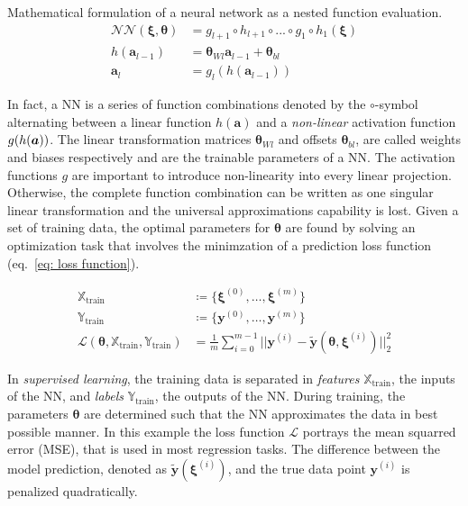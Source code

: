 \begin{definition} Mathematical formulation of a neural network as a nested function evaluation.
    \label{theory:def: neural network}
    \[
    \begin{aligned}
        \mathcal{NN}(\bm{\xi, \bm{\theta}}) &= g_{l+1} \circ h_{l+1} \circ ... \circ g_1 \circ h_1(\bm{\xi})
        \\
        h(\bm{a}_{l-1}) &= \bm{\theta}_{Wl}\bm{a}_{l-1} + \bm{\theta}_{bl}
        \\
        \bm{a}_{l} &= g_l(h(\bm{a}_{l-1}))
    \end{aligned}
    \]
\end{definition}

In fact, a NN is a series of function combinations denoted by the $\circ$-symbol alternating between a linear function $h(\bm{a})$
and a \emph{non-linear} activation function $g(h({\bm{a}}))$. The linear transformation matrices $\bm{\theta}_{Wl}$ and offsets $\bm{\theta}_{bl}$,
are called weights and biases respectively and are the trainable parameters of a NN. The activation functions $g$ are important
to introduce non-linearity into every linear projection. Otherwise, the complete function combination can be written as one 
singular linear transformation and the universal approximations capability is lost. Given a set of training data,
the optimal parameters for $\bm{\theta}$ are found by solving an optimization task that involves the minimzation of a prediction loss function (eq.~\ref{eq: loss function}).

\begin{equation}
    \label{eq: loss function}
    \begin{aligned}
        \mathbb{X}_\text{train} &\coloneq \{ \bm{\xi}^{(0)}, \hdots, \bm{\xi}^{(m)} \}
        \\
        \mathbb{Y}_\text{train} &\coloneq \{ \bm{y}^{(0)}, \hdots, \bm{y}^{(m)} \} 
        \\
        \mathcal{L}(\bm{\theta}, \mathbb{X}_\text{train}, \mathbb{Y}_\text{train}) &=
        \frac{1}{m} \sum_{i=0}^{m-1} \Big| \Big| \bm{y}^{(i)} - \bm{\tilde{y}}(\bm{\theta}, \bm{\xi}^{(i)}) \Big | \Big|_2^2
    \end{aligned}
\end{equation}

In \emph{supervised learning}, the training data is separated in \emph{features} $\mathbb{X}_\text{train}$, the inputs of the NN,
and \emph{labels} $\mathbb{Y}_\text{train}$, the outputs of the NN. During training, the parameters $\bm{\theta}$ are determined such that
the NN approximates the data in best possible manner.
In this example the loss function $\mathcal{L}$ portrays the mean squarred error (MSE), that is used in most regression tasks. 
The difference between the model prediction, denoted as $\bm{\tilde{y}}(\bm{\xi}^{(i)})$, and the true data point $\bm{y}^{(i)}$ is penalized quadratically.

